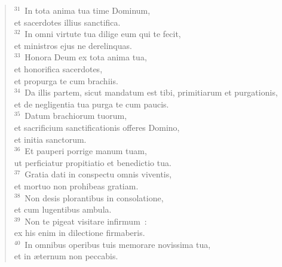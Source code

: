\begin{flushleft}\begin{verse}${}^{31}$~In tota anima tua time Dominum,\\ et sacerdotes illius sanctifica.\\
${}^{32}$~In omni virtute tua dilige eum qui te fecit,\\ et ministros ejus ne derelinquas.\\
${}^{33}$~Honora Deum ex tota anima tua,\\ et honorifica sacerdotes,\\ et propurga te cum brachiis.\\
${}^{34}$~Da illis partem, sicut mandatum est tibi, primitiarum et purgationis,\\ et de negligentia tua purga te cum paucis.\\
${}^{35}$~Datum brachiorum tuorum,\\ et sacrificium sanctificationis offeres Domino,\\ et initia sanctorum.\\
${}^{36}$~Et pauperi porrige manum tuam,\\ ut perficiatur propitiatio et benedictio tua.\\
${}^{37}$~Gratia dati in conspectu omnis viventis,\\ et mortuo non prohibeas gratiam.\\
${}^{38}$~Non desis plorantibus in consolatione,\\ et cum lugentibus ambula.\\
${}^{39}$~Non te pigeat visitare infirmum~:\\ ex his enim in dilectione firmaberis.\\
${}^{40}$~In omnibus operibus tuis memorare novissima tua,\\ et in \ae ternum non peccabis.\end{verse}\end{flushleft}



